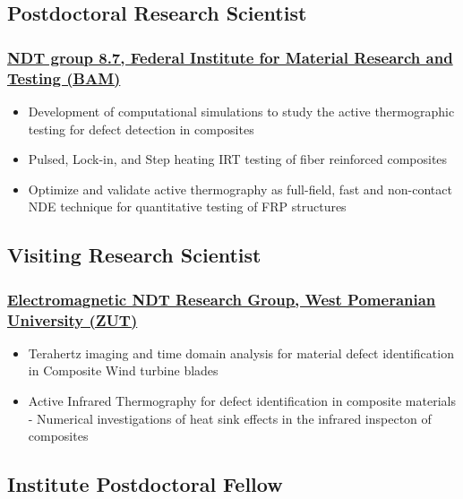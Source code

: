 \documentclass{my_cv}%
\begin{document}
\subsection{Postdoctoral Research Scientist}
\subsubsection{\href{https://www.bam.de/Navigation/DE/Home/home.html}{NDT group 8.7, Federal Institute for Material Research and Testing (BAM)}}
\begin{itemize}[leftmargin=0.15in]
\setlength\itemsep{-0.1em}
\color{mygray}
\item Development of computational simulations to study the active thermographic testing for defect detection in composites
\item Pulsed, Lock-in, and Step heating IRT testing of fiber reinforced composites 
\item Optimize and validate active thermography as full-field, fast and non-contact NDE technique for quantitative testing of FRP structures
\end{itemize}
{\color{mygray1} \hdashrule[0.1ex]{18.8cm}{0.2mm}{1mm}}
\subsection{Visiting Research Scientist}
\subsubsection{\href{https://innowacje.zut.edu.pl/cooperationoffer/electromagnetic-methods-non-destructive-testing}{Electromagnetic NDT Research Group, West Pomeranian University (ZUT)}}
\begin{itemize}[leftmargin=0.15in]
\setlength\itemsep{-0.1em}
\color{mygray}
\item Terahertz imaging and time domain analysis for material defect identification in Composite Wind turbine blades
\item Active Infrared Thermography for defect identification in composite materials - Numerical investigations of heat sink effects in the infrared inspecton of composites
\end{itemize}
{\color{mygray1} \hdashrule[0.1ex]{18.8cm}{0.2mm}{1mm}}
\subsection{Institute Postdoctoral Fellow}
\end{document}
